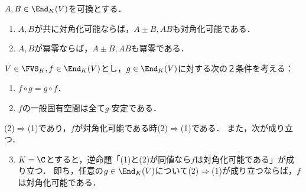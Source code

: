 \documentclass[uplatex, dvipdfmx]{jsreport}
\begin{document}
\begin{corollary}
    $A,B\in\End_K(V)$を可換とする．
    \begin{enumerate}
        \item $A,B$が共に対角化可能ならば，$A\pm B,AB$も対角化可能である．
        \item $A,B$が冪零ならば，$A\pm B,AB$も冪零である．
    \end{enumerate}
\end{corollary}

\begin{proposition}
    $V\in\FVS_K,f\in\End_K(V)$とし，$g\in\End_K(V)$に対する次の２条件を考える：
    \begin{enumerate}[(1)]
        \item $f\circ g=g\circ f$．
        \item $f$の一般固有空間は全て$g$-安定である．
    \end{enumerate}
    (2)$\Rightarrow$(1)であり，$f$が対角化可能である時(2)$\Rightarrow$(1)である．
    また，次が成り立つ．
    \begin{enumerate}[(1)]\setcounter{enumi}{2}
        \item $K=\C$とすると，逆命題「(1)と(2)が同値なら$f$は対角化可能である」が成り立つ．
        即ち，任意の$g\in\End_K(V)$について(2)$\Rightarrow$(1)が成り立つならば，$f$は対角化可能である．
    \end{enumerate}
\end{proposition}
\end{document}

